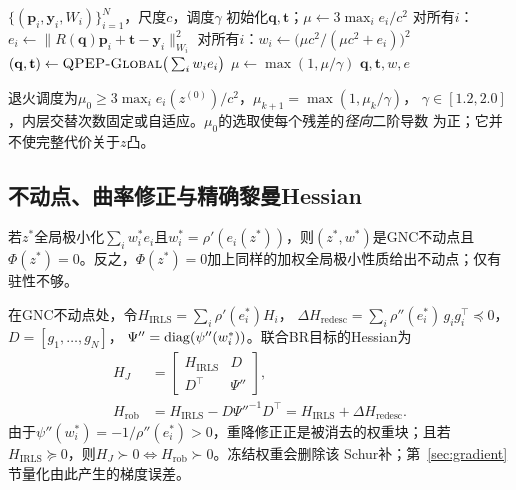 \begin{algorithm}[t]
\caption{前向GNC-QPEP（一次鲁棒求解）}
\label{alg:forward}
\footnotesize
\begin{algorithmic}[1]
\Require $\{(\mathbf{p}_i,\mathbf{y}_i,W_i)\}_{i=1}^N$，尺度$c$，调度$\gamma$
\State 初始化$\mathbf{q},\mathbf{t}$；$\mu\gets3\max_ie_i/c^2$
    \State 对所有$i$：$e_i\gets\|R(\mathbf{q})\mathbf{p}_i+\mathbf{t}-\mathbf{y}_i\|_{W_i}^2$
    \State 对所有$i$：$w_i\gets\big(\mu c^2/(\mu c^2+e_i)\big)^2$
    \State $(\mathbf{q},\mathbf{t})\gets\textsc{QPEP-Global}\big(\sum_iw_ie_i\big)$
  \EndFor
  \State $\mu\gets\max(1,\mu/\gamma)$
\EndWhile
\State \Return $\mathbf{q},\mathbf{t},w,e$
\end{algorithmic}
\end{algorithm}

退火调度为$\mu_0\ge3\max_ie_i(z^{(0)})/c^2$，$\mu_{k+1}=\max(1,\mu_k/\gamma)$，
$\gamma\in[1.2,2.0]$，内层交替次数固定或自适应。$\mu_0$的选取使每个残差的\emph{径向}二阶导数
为正；它并不使完整代价关于$z$凸。

\subsection{不动点、曲率修正与精确黎曼Hessian}

\begin{lemma}\label{lem:fixedpoint}
若$z^*$全局极小化$\sum_iw_i^*e_i$且$w_i^*=\rho'(e_i(z^*))$，则$(z^*,w^*)$是GNC不动点且
$\Phi(z^*)=0$。反之，$\Phi(z^*)=0$加上同样的加权全局极小性质给出不动点；仅有驻性不够。
\end{lemma}

\begin{lemma}[曲率修正$=$Schur补]\label{lem:schur}
在GNC不动点处，令$H_{\mathrm{IRLS}}=\sum_i\rho'(e_i^*)H_i$，
$\Delta H_{\mathrm{redesc}}=\sum_i\rho''(e_i^*)\,g_ig_i^\top\preceq0$，$D=[g_1,\dots,g_N]$，
$\Psi''=\operatorname{diag}(\psi''(w_i^*))$。联合BR目标的Hessian为
\begin{equation}
\begin{aligned}
H_J&=\begin{bmatrix}H_{\mathrm{IRLS}}&D\\D^\top&\Psi''\end{bmatrix},\\
H_{\mathrm{rob}}&=H_{\mathrm{IRLS}}-D\Psi''^{-1}D^\top
=H_{\mathrm{IRLS}}+\Delta H_{\mathrm{redesc}}.
\end{aligned}
\end{equation}
由于$\psi''(w_i^*)=-1/\rho''(e_i^*)>0$，重降修正正是被消去的权重块；且若
$H_{\mathrm{IRLS}}\succeq0$，则$H_J\succ0\iff H_{\mathrm{rob}}\succ0$。冻结权重会删除该
Schur补；第~\ref{sec:gradient}节量化由此产生的梯度误差。
\end{lemma}

